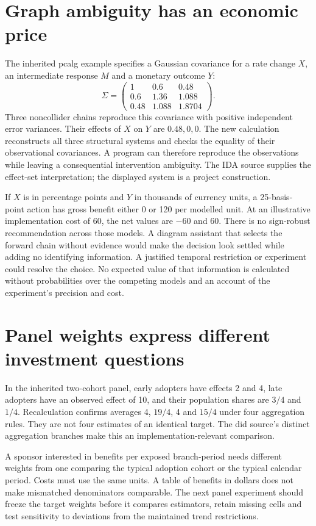 \section{Graph ambiguity has an economic price}
The inherited pcalg example specifies a Gaussian covariance for a rate change
$X$, an intermediate response $M$ and a monetary outcome $Y$:
\[
\Sigma=\begin{pmatrix}
1&0.6&0.48\\0.6&1.36&1.088\\0.48&1.088&1.8704
\end{pmatrix}.
\]
Three noncollider chains reproduce this covariance with positive independent
error variances. Their effects of $X$ on $Y$ are $0.48,0,0$. The new calculation
reconstructs all three structural systems and checks the equality of their
observational covariances. A program can therefore reproduce the observations
while leaving a consequential intervention ambiguity. The IDA source supplies
the effect-set interpretation; the displayed system is a project construction.
\citep{exec13_pcalg_reuse_primary}

If $X$ is in percentage points and $Y$ in thousands of currency units, a
25-basis-point action has gross benefit either 0 or 120 per modelled unit.
At an illustrative implementation cost of 60, the net values are $-60$ and
$60$. There is no sign-robust recommendation across those models. A diagram
assistant that selects the forward chain without evidence would make the
decision look settled while adding no identifying information. A justified
temporal restriction or experiment could resolve the choice. No expected value
of that information is calculated without probabilities over the competing
models and an account of the experiment's precision and cost.

\section{Panel weights express different investment questions}
In the inherited two-cohort panel, early adopters have effects 2 and 4, late
adopters have an observed effect of 10, and their population shares are $3/4$
and $1/4$. Recalculation confirms averages 4, $19/4$, 4 and $15/4$ under four
aggregation rules. They are not four estimates of an identical target. The
did source's distinct aggregation branches make this an implementation-relevant
comparison.
\citep{exec24_panelr_did}

A sponsor interested in benefits per exposed branch-period needs different
weights from one comparing the typical adoption cohort or the typical calendar
period. Costs must use the same units. A table of benefits in dollars does not
make mismatched denominators comparable. The next panel experiment should
freeze the target weights before it compares estimators, retain missing cells
and test sensitivity to deviations from the maintained trend restrictions.

